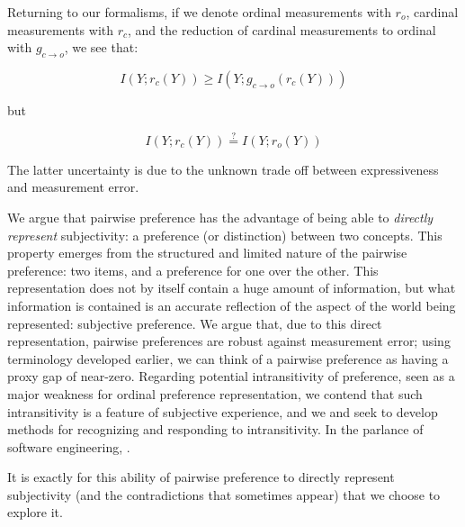 Returning to our formalisms, if we denote ordinal measurements with $r_o$, cardinal measurements with $r_c$, and the reduction of cardinal measurements to ordinal with $g_{c \rightarrow o}$, we see that:

\[
I(Y; r_c(Y)) \geq I(Y; g_{c \rightarrow o}(r_c(Y)))
\]

but 

\[
I(Y; r_c(Y)) \stackrel{?}{=} I(Y; r_o(Y))
\]

The latter uncertainty is due to the unknown trade off between expressiveness and measurement error.

\bigskip

We argue that pairwise preference has the advantage of being able to \textit{directly represent} subjectivity: a preference (or distinction) between two concepts.
This property emerges from the structured and limited nature of the pairwise preference: two items, and a preference for one over the other.
This representation does not by itself contain a huge amount of information, but what information is contained is an accurate reflection of the aspect of the world being represented: subjective preference.
We argue that, due to this direct representation, pairwise preferences are robust against measurement error; using terminology developed earlier, we can think of a pairwise preference as having a proxy gap of near-zero.
Regarding potential intransitivity of preference, seen as a major weakness for ordinal preference representation, we contend that such intransitivity is a feature of subjective experience, and we and seek to develop methods for recognizing and responding to intransitivity.
In the parlance of software engineering, .

It is exactly for this ability of pairwise preference to directly represent subjectivity (and the contradictions that sometimes appear) that we choose to explore it.